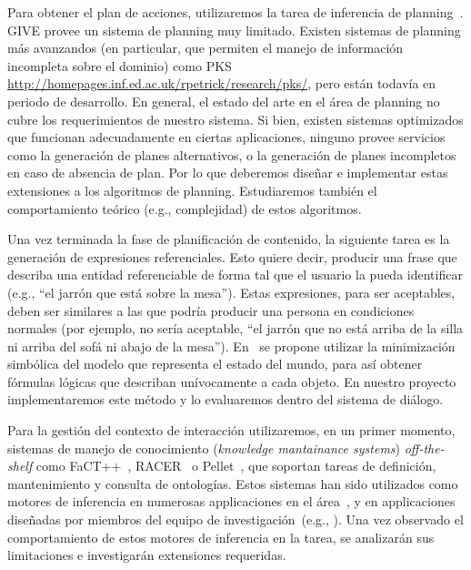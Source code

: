 Para obtener el plan de acciones, utilizaremos la tarea de inferencia de
planning~\citep{nau04}. GIVE provee un sistema de planning muy
limitado.  Existen sistemas de planning m\'as avanzandos (en particular,
que permiten el manejo de informaci\'on incompleta sobre el dominio)
como PKS \url{http://homepages.inf.ed.ac.uk/rpetrick/research/pks/}, pero
est\'an todav\'ia en periodo de desarrollo.  En general, el estado del
arte en el \'area de planning no cubre los requerimientos de nuestro
sistema.  Si bien, existen sistemas optimizados que funcionan adecuadamente
en ciertas aplicaciones, ninguno provee servicios como la generaci\'on de
planes alternativos, o la generaci\'on de planes incompletos en caso de
absencia de plan. Por lo que deberemos dise\~nar e implementar estas
extensiones a los algoritmos de planning. Estudiaremos tambi\'en el
comportamiento te\'orico (e.g., complejidad) de estos algoritmos. 

Una vez terminada la fase de planificaci\'on de contenido, la siguiente tarea
es la generaci\'on de expresiones referenciales. Esto quiere decir, producir una
frase que describa una entidad referenciable de forma tal que el usuario
la pueda identificar (e.g., ``el jarr\'on que est\'a sobre la mesa'').
Estas expresiones, para ser aceptables, deben ser similares a las que podr\'ia
producir una persona en condiciones normales (por ejemplo, no ser\'ia aceptable,
``el jarr\'on que no est\'a arriba de la silla ni arriba del
sof\'a ni abajo de la mesa'').  En~\citep{AKS08} se propone utilizar la
minimizaci\'on simb\'olica del modelo que representa
el estado del mundo, para as\'i obtener f\'ormulas l\'ogicas que describan
un\'ivocamente a cada objeto. En nuestro proyecto implementaremos este m\'etodo
y lo evaluaremos dentro del sistema de di\'alogo. 

Para la gesti\'on del contexto de interacci\'on utilizaremos, en un primer
momento, sistemas de manejo de conocimiento (\emph{knowledge mantainance
systems}) \emph{off-the-shelf} como
FaCT++~\citep{horr:fact99},
RACER~\citep{haar:race99} o Pellet~\citep{siri:pell06}, que soportan tareas de
definici\'on, mantenimiento y consulta de ontolog\'ias.  Estos sistemas
han sido utilizados como motores de inferencia
en numerosas applicaciones en el \'area~\citep{franconi03,koller04}, y en
applicaciones
dise\~nadas por miembros del equipo de
investigaci\'on~(e.g., \citep{benotti07,benotti09b}).  Una vez observado el
comportamiento de
estos motores de inferencia en la tarea, se analizar\'an sus limitaciones
e investigar\'an extensiones requeridas.  

